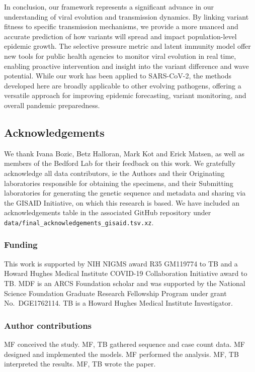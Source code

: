 \documentclass[11pt,oneside,letterpaper]{article}
\begin{document}
In conclusion, our framework represents a significant advance in our understanding of viral evolution and transmission dynamics.
By linking variant fitness to specific transmission mechanisms, we provide a more nuanced and accurate prediction of how variants will spread and impact population-level epidemic growth.
The selective pressure metric and latent immunity model offer new tools for public health agencies to monitor viral evolution in real time, enabling proactive intervention and insight into the variant difference and wave potential.
While our work has been applied to SARS-CoV-2, the methods developed here are broadly applicable to other evolving pathogens, offering a versatile approach for improving epidemic forecasting, variant monitoring, and overall pandemic preparedness.

\subsection*{Acknowledgements}

We thank Ivana Bozic, Betz Halloran, Mark Kot and Erick Matsen, as well as members of the Bedford Lab for their feedback on this work.
We gratefully acknowledge all data contributors, ie the Authors and their Originating
laboratories responsible for obtaining the specimens, and their Submitting laboratories for generating the genetic sequence and metadata and sharing via the GISAID Initiative, on which this research is based.
We have included an acknowledgements table in the associated GitHub repository under \texttt{data/final\_acknowledgements\_gisaid.tsv.xz}.

\subsubsection*{Funding}

This work is supported by NIH NIGMS award R35 GM119774 to TB and a Howard Hughes Medical Institute COVID-19 Collaboration Initiative award to TB.
MDF is an ARCS Foundation scholar and was supported by the National Science Foundation Graduate Research Fellowship Program under grant No.\ DGE1762114.
TB is a Howard Hughes Medical Institute Investigator.

\subsubsection*{Author contributions}
MF conceived the study.
MF, TB gathered sequence and case count data.
MF designed and implemented the models.
MF performed the analysis.
MF, TB interpreted the results.
MF, TB wrote the paper.
\end{document}
